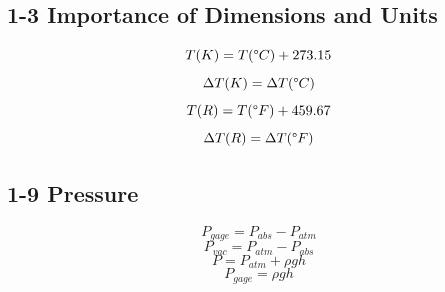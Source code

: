 \documentclass[10pt,landscape]{article}
\begin{document}
\begin{multicols}{3}
\subsection{1-3 Importance of Dimensions and Units}
\begin{equation}
    T(K)=T(\degree C)+273.15
\end{equation}
\begin{equation}
    \Delta T(K)=\Delta T(\degree C)
\end{equation}
\begin{equation}
    T(R)=T(\degree F)+459.67
\end{equation}
\begin{equation}
    \Delta T(R)=\Delta T(\degree F)
\end{equation}
\subsection{1-9 Pressure}
\begin{equation}
    P_{gage}=P_{abs}-P_{atm}
\end{equation}
\begin{equation}
    P_{vac}=P_{atm}-P_{abs}
\end{equation}
\begin{equation}
    P=P_{atm}+\rho gh
\end{equation}
\begin{equation}
    P_{gage}=\rho gh
\end{equation}


\end{multicols}
\end{document}
